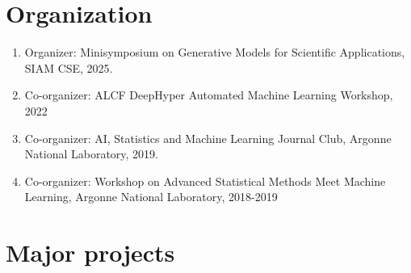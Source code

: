 \documentclass[letterpaper]{article}
\begin{document}

\section*{Organization}

\begin{enumerate}

\item Organizer: Minisymposium on Generative Models for Scientific Applications, SIAM CSE, 2025.

\item Co-organizer: ALCF DeepHyper Automated Machine Learning Workshop, 2022

\item Co-organizer: AI, Statistics and Machine Learning Journal Club, Argonne National Laboratory, 2019. 

\item Co-organizer: Workshop on Advanced Statistical Methods Meet Machine Learning, Argonne National Laboratory, 2018-2019 

\end{enumerate}



\section*{Major projects}
\end{document}
